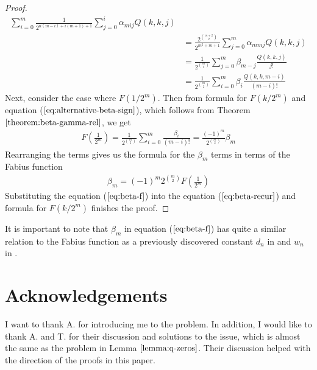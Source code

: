 \documentclass{article}
\begin{document}
\begin{proof}
\begin{align*}
    \sum_{i=0}^{m}
      \frac{1}{2^{n(m-i) + i(m+1)+1}}
      \sum_{j=0}^{i}
        \alpha_{mij}
        Q(k, k, j) \\
&= 
  \frac{2^{\binom{m+2}{2}}}
       {2^{m^2+m+1}}
  \sum_{j=0}^{m}
    \alpha_{mmj}
    Q(k, k, j) \\
&= 
  \frac{1}{2^{\binom{m}{2}}}
  \sum_{j=0}^{m}
    \beta_{m-j}
    \frac{Q(k, k, j)}{j!} \\
&= 
  \frac{1}{2^{\binom{m}{2}}}
  \sum_{i=0}^{m}
    \beta_{i}
    \frac{Q(k, k, m-i)}{(m-i)!}
\end{align*}
Next, consider the case where $F(1/2^m)$. Then from formula for $F(k/2^m)$ and equation ($\ref{eq:alternative-beta-sign}$), which follows from Theorem $\ref{theorem:beta-gamma-rel}$, we get
\begin{align*}
F\left(\frac{1}{2^m}\right)
= 
  \frac{1}{2^{\binom{m}{2}}}
  \sum_{i=0}^{m}
    \frac{\beta_{i}}{(m-i)!}
= 
  \frac{(-1)^m}{2^{\binom{m}{2}}} \beta_m
\end{align*}
Rearranging the terms gives us the formula for the $\beta_m$ terms in terms of the Fabius function
\begin{align}
\label{eq:beta-f}
\beta_m = (-1)^m2^{\binom{m}{2}}F\left(\frac{1}{2^m}\right)
\end{align}
Substituting the equation ($\ref{eq:beta-f}$) into the equation ($\ref{eq:beta-recur}$) and formula for $F(k/2^m)$ finishes the proof.
\end{proof}

It is important to note that $\beta_m$ in equation ($\ref{eq:beta-f}$) has quite a similar relation to the Fabius function as a previously discovered constant $d_n$ in \cite{dereyna2017arithmetic} and $w_n$ in \cite{slipperyslide}.

\section{Acknowledgements}
I want to thank A. for introducing me to the problem. In addition, I would like to thank A. and T. for their discussion and solutions to the issue, which is almost the same as the problem in Lemma $\ref{lemma:q-zeros}$. Their discussion helped with the direction of the proofs in this paper.



\end{document}
